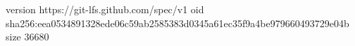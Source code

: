 version https://git-lfs.github.com/spec/v1
oid sha256:eea0534891328ede06c59ab2585383d0345a61ec35f9a4be979660493729e04b
size 36680
